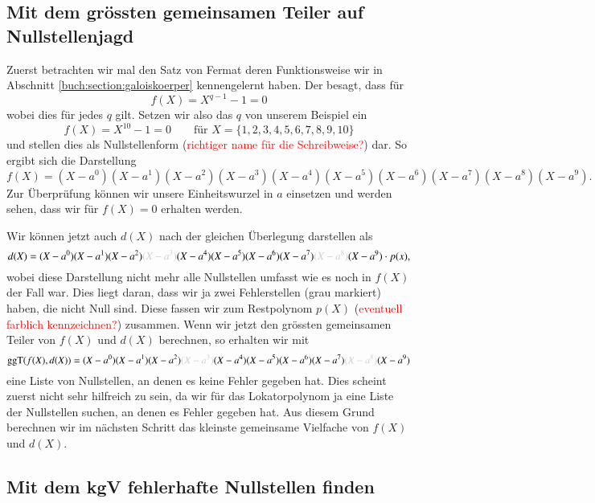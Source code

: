 \subsection{Mit dem grössten gemeinsamen Teiler auf Nullstellenjagd
\label{reedsolomon:subsection:ggT}}

Zuerst betrachten wir mal den Satz von Fermat deren Funktionsweise wir in Abschnitt \ref{buch:section:galoiskoerper} kennengelernt haben. Der besagt, dass für
\[
f(X) = X^{q-1} -1 = 0
\] 
wobei dies für jedes $q$ gilt. Setzen wir also das $q$ von unserem Beispiel ein
\[
f(X) = X^{10}-1 = 0 \qquad \text{für } X = \{1,2,3,4,5,6,7,8,9,10\}
\]
und stellen dies als Nullstellenform (\textcolor{red}{richtiger name für die Schreibweise?}) dar. So ergibt sich die Darstellung 
\[
f(X) = (X-a^0)(X-a^1)(X-a^2)(X-a^3)(X-a^4)(X-a^5)(X-a^6)(X-a^7)(X-a^8)(X-a^9).
\]
Zur Überprüfung können wir unsere Einheitswurzel in $a$ einsetzen und werden sehen, dass wir für $f(X) = 0$ erhalten werden.

Wir können jetzt auch $d(X)$ nach der gleichen Überlegung darstellen als 
\[
d(X) = (X-a^0)(X-a^1)(X-a^2)\textcolor{gray!40}{(X-a^3)}(X-a^4)(X-a^5)(X-a^6)(X-a^7)\textcolor{gray!40}{(X-a^8)}(X-a^9) \cdot p(x),
\]
wobei diese Darstellung nicht mehr alle Nullstellen umfasst wie es noch in $f(X)$ der Fall war. 
Dies liegt daran, dass wir ja zwei Fehlerstellen (grau markiert) haben, die nicht Null sind. Diese fassen wir zum Restpolynom $p(X)$ (\textcolor{red}{eventuell farblich kennzeichnen?}) zusammen.
Wenn wir jetzt den grössten gemeinsamen Teiler von $f(X)$ und $d(X)$ berechnen, so erhalten wir mit 
\[
\operatorname{ggT}(f(X),d(X)) = (X-a^0)(X-a^1)(X-a^2)\textcolor{gray!40}{(X-a^3)}(X-a^4)(X-a^5)(X-a^6)(X-a^7)\textcolor{gray!40}{(X-a^8)}(X-a^9)
\]
eine Liste von Nullstellen, an denen es keine Fehler gegeben hat.
Dies scheint zuerst nicht sehr hilfreich zu sein, da wir für das Lokatorpolynom ja eine Liste der Nullstellen suchen, an denen es Fehler gegeben hat. Aus diesem Grund berechnen wir im nächsten Schritt das kleinste gemeinsame Vielfache von $f(X)$ und $d(X)$. 


\subsection{Mit dem kgV fehlerhafte Nullstellen finden
	\label{reedsolomon:subsection:kgV}}

